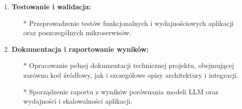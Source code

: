 \begin{enumerate}
    \item {\bf Testowanie i walidacja:}
        \begin{itemize}
            \item[*] Przeprowadzenie testów funkcjonalnych i wydajnościowych aplikacji oraz poszczególnych mikroserwisów.
       \end{itemize}
    
    \item {\bf Dokumentacja i raportowanie wyników:}
        \begin{itemize}
            \item[*] Opracowanie pełnej dokumentacji technicznej projektu, obejmującej zarówno kod źródłowy, jak i szczegółowe opisy architektury i integracji.
            \item[*] Sporządzenie raportu z wyników porównania modeli LLM oraz wydajności i skalowalności aplikacji.
       \end{itemize}

\end{enumerate}

